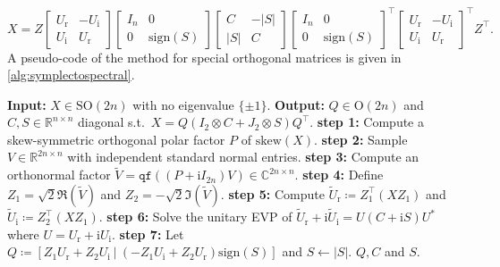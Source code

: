\documentclass[final,onefignum,onetabnum,dvipsnames]{siamart251216}
\numberwithin{algorithm}{section}
\numberwithin{equation}{section}
\begin{document}
\begin{equation*}
    X = Z \begin{bmatrix}
        U_\mathrm{r}&-U_\mathrm{i}\\
        U_\mathrm{i}&U_\mathrm{r}
    \end{bmatrix}\begin{bmatrix}
        I_n&0\\
        0&\mathrm{sign}(S)
    \end{bmatrix}\begin{bmatrix}
        C&-|S|\\
        |S|&C
    \end{bmatrix}\begin{bmatrix}
        I_n&0\\
        0&\mathrm{sign}(S)
    \end{bmatrix}^\top\begin{bmatrix}
        U_\mathrm{r}&-U_\mathrm{i}\\
        U_\mathrm{i}&U_\mathrm{r}
    \end{bmatrix}^\top Z^\top.
\end{equation*}
A pseudo-code of the method for special orthogonal matrices is given in \cref{alg:symplectospectral}. 

\begin{algorithm}[ht]
    \caption{RSD of special orthogonal matrix}
    \begin{algorithmic}
        \STATE \textbf{Input:} $X\in\mathrm{SO}(2n)$  with no eigenvalue $\{\pm1\}$.
        \STATE \textbf{Output:} $Q\in\mathrm{O}(2n)$ and $C,S\in\mathbb{R}^{n\times n}$ diagonal s.t.~$X = Q (I_2\otimes C +J_2 \otimes S )Q^\top$.
        \STATE \textbf{step 1:} Compute a skew-symmetric orthogonal polar factor $P$ of $\mathrm{skew}(X)$.
        \STATE \textbf{step 2:} Sample $V \in \mathbb R^{2n\times n}$ with independent standard normal entries. %
        \STATE \textbf{step 3:} Compute an orthonormal factor $\widetilde{V} = \texttt{qf}((P + \mathrm{i}I_{2n})V)\in\mathbb{C}^{2n\times n}$.
        \STATE \textbf{step 4:} Define $Z_1 = \sqrt{2} \Re(\widetilde{V})$ and $Z_2 = -\sqrt{2} \Im(\widetilde{V})$.
        \STATE \textbf{step 5:} Compute $\widetilde{U}_\mathrm{r}\coloneq  Z_1^\top (X Z_1)$ and $\widetilde{U}_\mathrm{i}\coloneq Z_2^\top (X Z_1) $.
        \STATE \textbf{step 6:} Solve the unitary EVP of $\widetilde{U}_\mathrm{r} + \mathrm{i}\widetilde{U}_\mathrm{i}= U(C+\mathrm{i}S)U^*$ where $U = U_\mathrm{r} + \mathrm{i} U_\mathrm{i}$.
        \STATE \textbf{step 7:} Let $Q \coloneq  [Z_1U_\mathrm{r} + Z_2U_\mathrm{i}\ |\ (-Z_1 U_\mathrm{i} + Z_2 U_\mathrm{r})\mathrm{sign}(S)]$ and $S\leftarrow |S|$.
        \RETURN $Q,C$ and $S$.
    \end{algorithmic}
    \label{alg:symplectospectral}
\end{algorithm}
\end{document}
